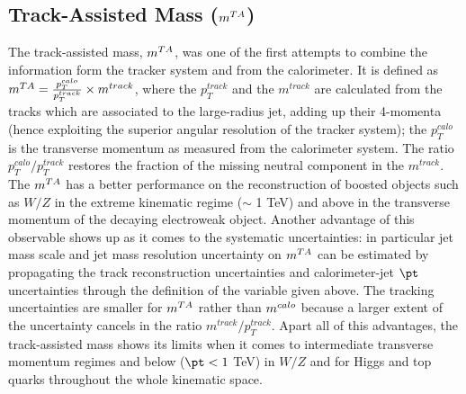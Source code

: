 \subsection{Track-Assisted Mass ($m^{TA}$)}
The track-assisted mass, $m^{TA}$, was one of the first attempts to combine the information form the tracker system and from the calorimeter. It is defined as $m^{TA}=\frac{p_T^{calo}}{p_T^{track}}\times m^{track}$, where the $p_T^{track}$ and the $m^{track}$ are calculated from the tracks which are associated to the large-radius jet, adding up their 4-momenta (hence exploiting the superior angular resolution of the tracker system); the $p_T^{calo}$ is the transverse momentum as measured from the calorimeter system. The ratio $p_T^{calo}/p_T^{track}$ restores the fraction of the missing neutral component in the $m^{track}$.
The $m^{TA}$ has a better performance on the reconstruction of boosted objects such as $W/Z$ in the extreme kinematic regime ($\sim $ 1 TeV) and above in the transverse momentum of the decaying electroweak object. Another advantage of this observable shows up as it comes to the systematic uncertainties: in particular jet mass scale and jet mass resolution uncertainty on $m^{TA}$ can be estimated by propagating the track reconstruction uncertainties and calorimeter-jet $\pt$ uncertainties through the definition of the variable given above. The tracking uncertainties are smaller for $m^{TA}$ rather than $m^{calo}$ because a larger extent of the uncertainty cancels in the ratio $m^{track}/p_T^{track}$.
Apart all of this advantages, the track-assisted mass shows its limits when it comes to intermediate transverse momentum regimes and below ($\pt < 1 $ TeV) in $W/Z$ and for Higgs and top quarks throughout the whole kinematic space.
